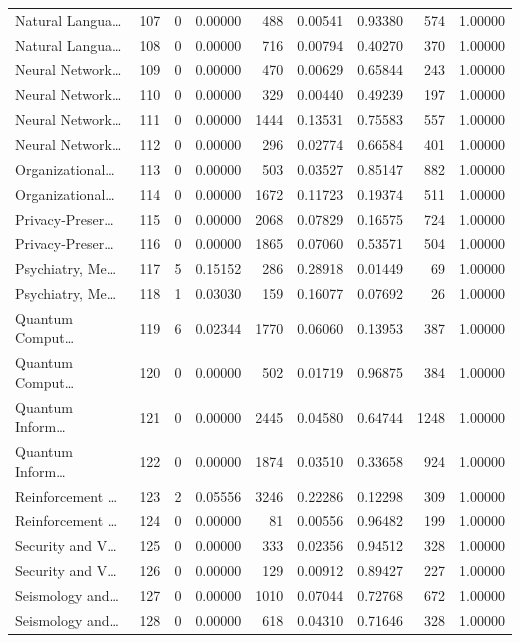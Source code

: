 \begin{table}
\begin{tabular}{lrrrrrrrr}
Natural Langua… & 107 & 0 & 0.00000 & 488 & 0.00541 & 0.93380 & 574 & 1.00000 \\
Natural Langua… & 108 & 0 & 0.00000 & 716 & 0.00794 & 0.40270 & 370 & 1.00000 \\
Neural Network… & 109 & 0 & 0.00000 & 470 & 0.00629 & 0.65844 & 243 & 1.00000 \\
Neural Network… & 110 & 0 & 0.00000 & 329 & 0.00440 & 0.49239 & 197 & 1.00000 \\
Neural Network… & 111 & 0 & 0.00000 & 1444 & 0.13531 & 0.75583 & 557 & 1.00000 \\
Neural Network… & 112 & 0 & 0.00000 & 296 & 0.02774 & 0.66584 & 401 & 1.00000 \\
Organizational… & 113 & 0 & 0.00000 & 503 & 0.03527 & 0.85147 & 882 & 1.00000 \\
Organizational… & 114 & 0 & 0.00000 & 1672 & 0.11723 & 0.19374 & 511 & 1.00000 \\
Privacy-Preser… & 115 & 0 & 0.00000 & 2068 & 0.07829 & 0.16575 & 724 & 1.00000 \\
Privacy-Preser… & 116 & 0 & 0.00000 & 1865 & 0.07060 & 0.53571 & 504 & 1.00000 \\
Psychiatry, Me… & 117 & 5 & 0.15152 & 286 & 0.28918 & 0.01449 & 69 & 1.00000 \\
Psychiatry, Me… & 118 & 1 & 0.03030 & 159 & 0.16077 & 0.07692 & 26 & 1.00000 \\
Quantum Comput… & 119 & 6 & 0.02344 & 1770 & 0.06060 & 0.13953 & 387 & 1.00000 \\
Quantum Comput… & 120 & 0 & 0.00000 & 502 & 0.01719 & 0.96875 & 384 & 1.00000 \\
Quantum Inform… & 121 & 0 & 0.00000 & 2445 & 0.04580 & 0.64744 & 1248 & 1.00000 \\
Quantum Inform… & 122 & 0 & 0.00000 & 1874 & 0.03510 & 0.33658 & 924 & 1.00000 \\
Reinforcement … & 123 & 2 & 0.05556 & 3246 & 0.22286 & 0.12298 & 309 & 1.00000 \\
Reinforcement … & 124 & 0 & 0.00000 & 81 & 0.00556 & 0.96482 & 199 & 1.00000 \\
Security and V… & 125 & 0 & 0.00000 & 333 & 0.02356 & 0.94512 & 328 & 1.00000 \\
Security and V… & 126 & 0 & 0.00000 & 129 & 0.00912 & 0.89427 & 227 & 1.00000 \\
Seismology and… & 127 & 0 & 0.00000 & 1010 & 0.07044 & 0.72768 & 672 & 1.00000 \\
Seismology and… & 128 & 0 & 0.00000 & 618 & 0.04310 & 0.71646 & 328 & 1.00000 \\

\end{tabular}
\end{table}
